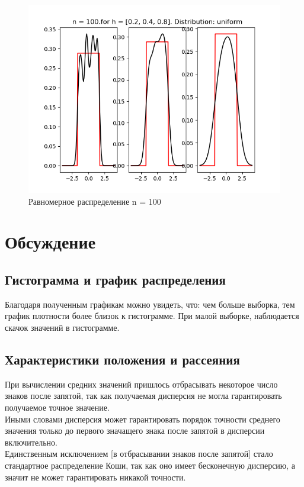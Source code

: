 \documentclass[a4]{article}
\begin{document}
\begin{center}
\begin{figure}[h!]
				\includegraphics[width=\textwidth]{uniformker100.png}
				\caption[Равномерное распределение n = 100]{Равномерное распределение n = 100}
			\end{figure}
			
		\end{center}
		
		\newpage
		
	\section{Обсуждение}
		\subsection{Гистограмма и график распределения}
		Благодаря полученным графикам можно увидеть, что: чем больше выборка, тем график плотности более близок к гистограмме. При малой выборке, наблюдается скачок значений в гистограмме.
		
		\subsection{Характеристики положения и рассеяния}
			При вычислении средних значений пришлось отбрасывать некоторое число знаков после запятой, так как получаемая дисперсия не могла гарантировать получаемое точное значение. \\
			Иными словами дисперсия может гарантировать порядок точности среднего значения только до первого значащего знака после запятой в дисперсии включительно.\\ Единственным исключением [в отбрасывании знаков после запятой] стало стандартное распределение Коши, так как оно имеет бесконечную дисперсию, а значит не может гарантировать никакой точности.
			
\end{document}
